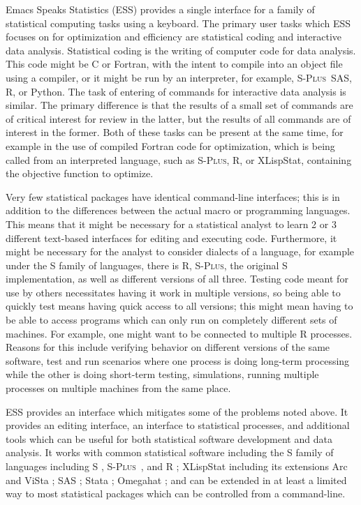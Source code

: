 \documentclass{article}
\newcommand*{\Splus}{\textsc{S-Plus}}
\begin{document}
Emacs Speaks Statistics (ESS) provides a single interface for a family
of statistical computing tasks using a keyboard.  The primary user
tasks which ESS focuses on for optimization and efficiency are
statistical coding and interactive data analysis.  Statistical coding
is the writing of computer code for data analysis.  This code might be
C or Fortran, with the intent to compile into an object file using a
compiler, or it might be run by an interpreter, for example, \Splus\,
SAS, R, or Python.  The task of entering of commands for interactive
data analysis is similar.  The primary difference is that the results
of a small set of commands are of critical interest for review in the
latter, but the results of all commands are of interest in the former.
Both of these tasks can be present at the same time, for example in
the use of compiled Fortran code for optimization, which is being
called from an interpreted language, such as \Splus, R, or XLispStat,
containing the objective function to optimize.

Very few statistical packages have identical command-line interfaces;
this is in addition to the differences between the actual macro or
programming languages.  This means that it might be necessary for a
statistical analyst to learn 2 or 3 different text-based interfaces
for editing and executing code.  Furthermore, it might be necessary
for the analyst to consider dialects of a language, for example under
the S family of languages, there is R, \Splus, the original S
implementation, as well as different versions of all three.  Testing
code meant for use by others necessitates having it work in multiple
versions, so being able to quickly test means having quick access to
all versions; this might mean having to be able to access programs
which can only run on completely different sets of machines.  For
example, one might want to be connected to multiple R processes.
Reasons for this include verifying behavior on different versions of
the same software, test and run scenarios where one process is doing
long-term processing while the other is doing short-term testing,
simulations, running multiple processes on multiple machines from the
same place.

ESS provides an interface which mitigates some of the problems noted
above.  It provides an editing interface, an interface to statistical
processes, and additional tools which can be useful for both
statistical software development and data analysis.  It works with
common statistical software including the S family of languages
including S \citep{BecRCW88,ChaJH92,ChaJ98}, \Splus\ \citep{Splus},
and R \citep{ihak:gent:1996}; XLispStat \citep{Tier90} including its
extensions Arc \citep{Cook:Weisberg:1999} and ViSta
\citep{youn:fald:mcfa:1992}; SAS \citep{SAS:8.0}; Stata
\citep{Stata:6.0}; Omegahat \citep{DTLang:2000}; and can be extended
in at least a limited way to most statistical packages which can be
controlled from a command-line.
\end{document}
